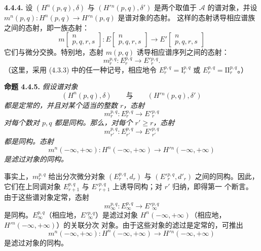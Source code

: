 \clearpage
{}%
\begingroup\small\setlength{\parskip}{0pt}\setlength{\emergencystretch}{1.5em}
\medskip\noindent\textbf{4.4.4.}\quad
设 $(H^n(p,q),\delta)$ 与 $(H'{}^n(p,q),\delta')$ 是两个取值于
$\mathcal A$ 的谱对象，并设
$m^n(p,q)\colon H^n(p,q)\longrightarrow H'{}^n(p,q)$ 是谱对象的态射。
这样的态射诱导相应谱族之间的态射，即一族态射：
\[
m\!\left[\begin{smallmatrix}n\\p,q,r,s\end{smallmatrix}\right]
\colon
E\!\left[\begin{smallmatrix}n\\p,q,r,s\end{smallmatrix}\right]
\longrightarrow
E'\!\left[\begin{smallmatrix}n\\p,q,r,s\end{smallmatrix}\right]
\]
它们与微分交换。特别地，态射 $m(p,q)$ 诱导相应谱序列之间的态射：
\[
m_r^{p,q}\colon E_r^{p,q}\longrightarrow E'{}_{r}^{p,q}.
\]
（这里，采用 (4.3.3) 中的任一种记号，相应地令
$E_r^{p,q}=\mathrm I_r^{p,q}$ 或 $E_r^{p,q}=\mathrm{II}_r^{p,q}$。）

\medskip\noindent\textbf{命题 4.4.5.}\quad
\textit{假设谱对象}
\[
(H^n(p,q),\delta)
\qquad\textit{与}\qquad
(H'{}^n(p,q),\delta')
\]
\textit{都是定常的，并且对某个适当的整数 $r$，态射}
\[
m_r^{p,q}\colon E_r^{p,q}\longrightarrow E'{}_{r}^{p,q}
\]
\textit{对每个数对 $p,q$ 都是同构。那么，对每个 $r'\geq r$，态射}
\[
m_{r'}^{p,q}\colon E_{r'}^{p,q}\longrightarrow E'{}_{r'}^{p,q}
\]
\textit{都是同构。态射}
\[
m^n(-\infty,+\infty)\colon H^n(-\infty,+\infty)
\longrightarrow H'{}^n(-\infty,+\infty)
\]
\textit{是滤过对象的同构。}

事实上，$m_r^{p,q}$ 给出分次微分对象 $(E_r^{p,q},d_r)$ 与
$(E'{}_{r}^{p,q},d'_r)$ 之间的同构。因此，它们在上同调对象
$E_{r+1}^{p,q}$ 与 $E'{}_{r+1}^{p,q}$ 上诱导同构；对 $r'$ 归纳，即得第一
个断言。由于这些谱对象定常，态射
\[
m_\infty^{p,q}\colon E_\infty^{p,q}\longrightarrow
E'{}_{\infty}^{p,q}
\]
是同构。$E_\infty^{p,q}$（相应地，$E'{}_{\infty}^{p,q}$）是滤过对象
$H^n(-\infty,+\infty)$（相应地，$H'{}^n(-\infty,+\infty)$）的关联分次
对象。由于这些对象的滤过是定常的，可推出
\[
m^n(-\infty,+\infty)\colon H^n(-\infty,+\infty)
\longrightarrow H'{}^n(-\infty,+\infty)
\]
是滤过对象的同构。
\endgroup
